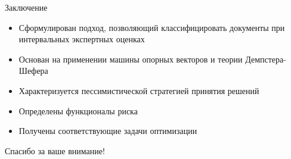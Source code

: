 \documentclass[11pt]{beamer}
\begin{document}
\begin{frame}{Заключение}

\begin{itemize}
	\item Сформулирован подход, позволяющий классифицировать документы при интервальных экспертных оценках
	\item Основан на применении машины опорных векторов и теории Демпстера-Шефера
	\item Характеризуется пессимистической стратегией принятия решений
	\item Определены функционалы риска
	\item Получены соответствующие задачи оптимизации
\end{itemize}

\end{frame}
\begin{frame}

\begin{center}
{\Large Спасибо за ваше внимание!}
\end{center}

\end{frame}
\end{document}
